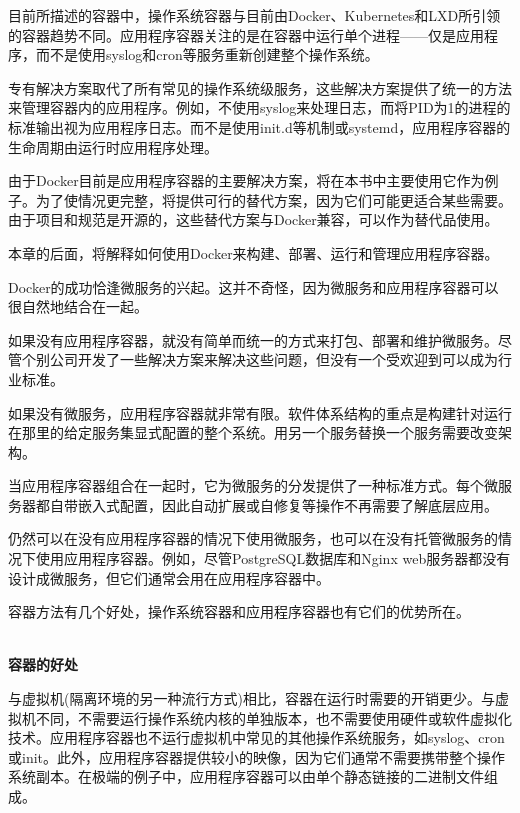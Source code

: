 目前所描述的容器中，操作系统容器与目前由Docker、Kubernetes和LXD所引领的容器趋势不同。应用程序容器关注的是在容器中运行单个进程——仅是应用程序，而不是使用syslog和cron等服务重新创建整个操作系统。

专有解决方案取代了所有常见的操作系统级服务，这些解决方案提供了统一的方法来管理容器内的应用程序。例如，不使用syslog来处理日志，而将PID为1的进程的标准输出视为应用程序日志。而不是使用init.d等机制或systemd，应用程序容器的生命周期由运行时应用程序处理。

由于Docker目前是应用程序容器的主要解决方案，将在本书中主要使用它作为例子。为了使情况更完整，将提供可行的替代方案，因为它们可能更适合某些需要。由于项目和规范是开源的，这些替代方案与Docker兼容，可以作为替代品使用。

本章的后面，将解释如何使用Docker来构建、部署、运行和管理应用程序容器。


Docker的成功恰逢微服务的兴起。这并不奇怪，因为微服务和应用程序容器可以很自然地结合在一起。

如果没有应用程序容器，就没有简单而统一的方式来打包、部署和维护微服务。尽管个别公司开发了一些解决方案来解决这些问题，但没有一个受欢迎到可以成为行业标准。

如果没有微服务，应用程序容器就非常有限。软件体系结构的重点是构建针对运行在那里的给定服务集显式配置的整个系统。用另一个服务替换一个服务需要改变架构。

当应用程序容器组合在一起时，它为微服务的分发提供了一种标准方式。每个微服务器都自带嵌入式配置，因此自动扩展或自修复等操作不再需要了解底层应用。

仍然可以在没有应用程序容器的情况下使用微服务，也可以在没有托管微服务的情况下使用应用程序容器。例如，尽管PostgreSQL数据库和Nginx web服务器都没有设计成微服务，但它们通常会用在应用程序容器中。


容器方法有几个好处，操作系统容器和应用程序容器也有它们的优势所在。

\hspace*{\fill} \\ %
\noindent
\textbf{容器的好处}

与虚拟机(隔离环境的另一种流行方式)相比，容器在运行时需要的开销更少。与虚拟机不同，不需要运行操作系统内核的单独版本，也不需要使用硬件或软件虚拟化技术。应用程序容器也不运行虚拟机中常见的其他操作系统服务，如syslog、cron或init。此外，应用程序容器提供较小的映像，因为它们通常不需要携带整个操作系统副本。在极端的例子中，应用程序容器可以由单个静态链接的二进制文件组成。

